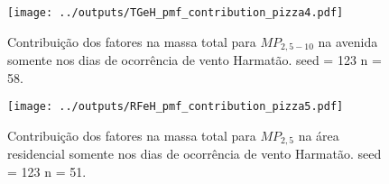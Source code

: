 \begin{landscape}
  \begin{figure}
    \centering
    \begin{minipage}[b]{0.45\linewidth}
      \texttt{[image: ../outputs/TGeH\_pmf\_contribution\_pizza4.pdf]}
      \caption{Contribuição dos fatores na massa total para $MP_{2,5-10}$ na avenida
               somente nos dias de ocorrência de vento Harmatão. seed = 123 n = 58.
               \label{fig:TGeH_contribution4}}
    \end{minipage}%
    \hspace{0.5cm}
    \begin{minipage}[b]{0.45\linewidth}
      
    \end{minipage}
  \end{figure}
\end{landscape}


\begin{landscape}
  \begin{figure}
    \centering
    \begin{minipage}[b]{0.45\linewidth}
      \texttt{[image: ../outputs/RFeH\_pmf\_contribution\_pizza5.pdf]}
      \caption{Contribuição dos fatores na massa total para $MP_{2,5}$ na área
               residencial somente nos dias de ocorrência de vento Harmatão. seed = 123 n = 51.
               \label{fig:RFeH_contribution5}}
    \end{minipage}%
    \hspace{0.5cm}
    \begin{minipage}[b]{0.45\linewidth}
      
    \end{minipage}
  \end{figure}
\end{landscape}


